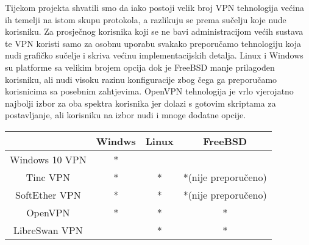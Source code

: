 Tijekom projekta shvatili smo da iako postoji velik broj VPN tehnologija
većina ih temelji na istom skupu protokola, a razlikuju se prema sučelju koje
nude korisniku. Za prosječnog korisnika koji se ne bavi administracijom većih
sustava te VPN koristi samo za osobnu uporabu svakako preporučamo tehnologiju
koja nudi grafičko sučelje i skriva većinu implementacijskih detalja. Linux i
Windows su platforme sa velikim brojem opcija dok je FreeBSD manje
prilagođen korisniku, ali nudi visoku razinu konfiguracije zbog čega ga
preporučamo korisnicima sa posebnim zahtjevima. OpenVPN tehnologija je vrlo
vjerojatno najbolji izbor za oba spektra korisnika jer dolazi s gotovim
skriptama za postavljanje, ali korisniku na izbor nudi i mnoge dodatne opcije. 
\begin{center}
\begin{tabular}{c | c | c | c }
	 & \textbf{Windws} & \textbf{Linux} & \textbf{FreeBSD} \\
	 \hline

	Windows 10 VPN & * & &  \\
	\hline
        Tinc VPN & * & * & *(nije preporučeno)  \\
	\hline
	SoftEther VPN & * & * & *(nije preporučeno) \\
	\hline
	OpenVPN & * & * & *  \\
	\hline
	LibreSwan VPN & & *  & * \\
\end{tabular}
\end{center}
